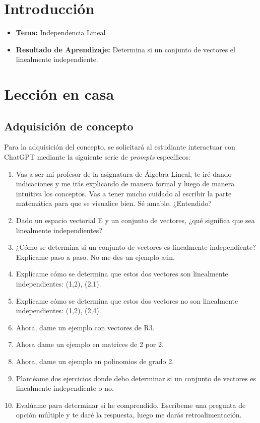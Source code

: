 \documentclass[a4,11pt]{aleph-notas}
\begin{document}
\encabezado

\section*{Introducción}

\begin{itemize}
    \item \textbf{Tema:} Independencia Lineal
    \item \textbf{Resultado de Aprendizaje:} Determina si un conjunto de vectores el linealmente independiente.
\end{itemize}

\section{Lección en casa}

\subsection{Adquisición de concepto}

Para la adquisición del concepto, se solicitará al estudiante interactuar con ChatGPT mediante la siguiente serie de \textit{prompts} específicos:

\begin{enumerate}[label=\textit{Prompt \arabic*.},leftmargin=2.1cm]
    \item Vas a ser mi profesor de la asignatura de Álgebra Lineal, te iré dando indicaciones y me irás explicando de manera formal y luego de manera intuitiva los conceptos. Vas a tener mucho cuidado al escribir la parte matemática para que se visualice bien. Sé amable. ¿Entendido?
    \item Dado un espacio vectorial E y un conjunto de vectores, ¿qué significa que sea linealmente independientes?
    \item ¿Cómo se determina si un conjunto de vectores es linealmente independiente? Explícame paso a paso. No me des un ejemplo aún.
    \item Explícame cómo se determina que estos dos vectores son linealmente independientes: (1,2), (2,1). 
    \item Explícame cómo se determina que estos dos vectores no son linealmente independientes: (1,2), (2,4). 
    \item Ahora, dame un ejemplo con vectores de R3.
    \item Ahora dame un ejemplo en matrices de 2 por 2.
    \item Ahora, dame un ejemplo en polinomios de grado 2.
    \item Plantéame dos ejercicios donde debo determinar si un conjunto de vectores es linealmente independiente o no.
    \item Evalúame para determinar si he comprendido. Escríbeme una pregunta de opción múltiple y te daré la respuesta, luego me darás retroalimentación.
\end{enumerate}
\end{document}
